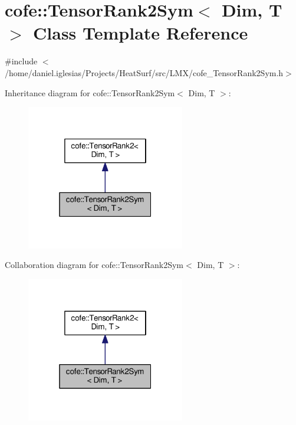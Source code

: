 \hypertarget{classcofe_1_1TensorRank2Sym}{\section{cofe\-:\-:Tensor\-Rank2\-Sym$<$ Dim, T $>$ Class Template Reference}
\label{classcofe_1_1TensorRank2Sym}
}


{\ttfamily \#include $<$/home/daniel.\-iglesias/\-Projects/\-Heat\-Surf/src/\-L\-M\-X/cofe\-\_\-\-Tensor\-Rank2\-Sym.\-h$>$}



Inheritance diagram for cofe\-:\-:Tensor\-Rank2\-Sym$<$ Dim, T $>$\-:
\nopagebreak
\begin{figure}[H]
\begin{center}
\leavevmode
\includegraphics[width=196pt]{classcofe_1_1TensorRank2Sym__inherit__graph}
\end{center}
\end{figure}


Collaboration diagram for cofe\-:\-:Tensor\-Rank2\-Sym$<$ Dim, T $>$\-:
\nopagebreak
\begin{figure}[H]
\begin{center}
\leavevmode
\includegraphics[width=196pt]{classcofe_1_1TensorRank2Sym__coll__graph}
\end{center}
\end{figure}
